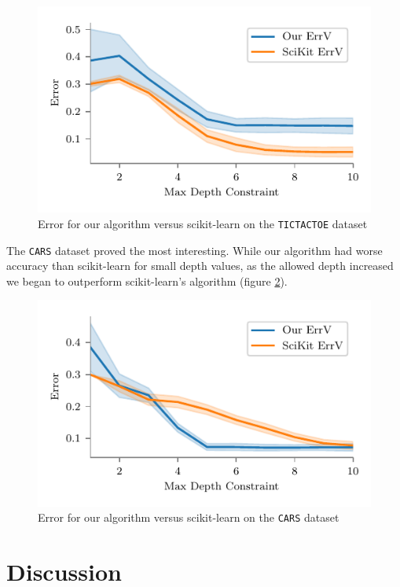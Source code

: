 \documentclass[screen, authorversion, nonacm, sigconf]{acmart}
\begin{document}
\begin{figure}
  \centering
  \includegraphics[width=\columnwidth]{figures/chart_ours_v_scikit_variance_tictactoe.pdf}
  \caption{Error for our algorithm versus scikit-learn on the \texttt{TICTACTOE} dataset}
  \label{fig:tttoursvscikit}
\end{figure}

The \texttt{CARS} dataset proved the most interesting. While our algorithm had worse accuracy than scikit-learn for small depth values, as the allowed depth increased we began to outperform scikit-learn's algorithm (figure \ref{fig:caroursvscikit}).

\begin{figure}
  \centering
  \includegraphics[width=\columnwidth]{figures/chart_ours_v_scikit_variance_car.pdf}
  \caption{Error for our algorithm versus scikit-learn on the \texttt{CARS} dataset}
  \label{fig:caroursvscikit}
\end{figure}

\section{Discussion}
\end{document}
